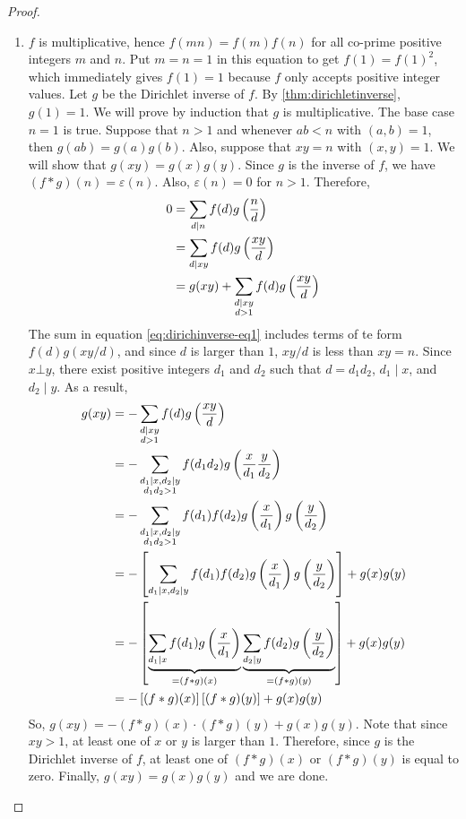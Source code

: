 \begin{proof}
\begin{enumerate}
			\item $f$ is multiplicative, hence $f(mn)=f(m)f(n)$ for all co-prime positive integers $m$ and $n$. Put $m=n=1$ in this equation to get $f(1)=f(1)^2$, which immediately gives $f(1)=1$ because $f$ only accepts positive integer values. Let $g$ be the Dirichlet inverse of $f$. By \autoref{thm:dirichletinverse}, $g(1)=1$. We will prove by induction that $g$ is multiplicative. The base case $n=1$ is true. Suppose that $n>1$ and whenever $ab<n$ with $(a,b)=1$, then $g(ab)=g(a)g(b)$. Also, suppose that $xy=n$ with $(x,y)=1$. We will show that $g(xy)=g(x)g(y)$. Since $g$ is the inverse of $f$, we have $(f \ast g)(n) = \varepsilon(n)$. Also, $\varepsilon(n)=0$ for $n>1$. Therefore,
				\begin{align}
					0 & = \sum_{d\mid n} f(d)g\left(\frac{n}{d}\right)\nonumber\\
			  & = \sum_{d\mid xy} f(d)g\left(\frac{xy}{d}\right) \nonumber\\
			  & = g(xy) + \sum\limits_{\substack{d\mid xy \\ d>1}} f(d)g\left(\frac{xy}{d}\right)\label{eq:dirichinverse-eq1}
				\end{align}
			The sum in equation \ref{eq:dirichinverse-eq1} includes terms of te form $f(d)g(xy/d)$, and since $d$ is larger than $1$, $xy/d$ is less than $xy=n$. Since $x \bot y$, there exist positive integers $d_1$ and $d_2$ such that $d=d_1d_2$, $d_1\mid x$, and $d_2\mid y$. As a result,
				\begin{align*}
					g(xy) &= - \sum\limits_{\substack{d\mid xy \\ d>1}} f(d)g\left(\frac{xy}{d}\right)\\
				  &= - \sum\limits_{\substack{d_1\mid x, d_2\mid y \\ d_1d_2>1}} f(d_1d_2)g\left(\frac{x}{d_1} \frac{y}{d_2}\right)\\
				  &= - \sum\limits_{\substack{d_1\mid x, d_2\mid y \\ d_1d_2>1}} f(d_1)f(d_2)g\left(\frac{x}{d_1}\right)g\left(\frac{y}{d_2}\right)\\
				  &= - \left[\sum\limits_{d_1\mid x, d_2\mid y} f(d_1)f(d_2)g\left(\frac{x}{d_1}\right)g\left(\frac{y}{d_2}\right)\right]+ g(x)g(y)\\
				  & = - \left[\underbrace{\sum\limits_{d_1\mid x} f(d_1)g\left(\frac{x}{d_1}\right)}_{=(f \ast g)(x)} \underbrace{\sum\limits_{d_2\mid y} f(d_2) g\left(\frac{y}{d_2}\right)}_{=(f \ast g)(y)}\right]+ g(x)g(y)\\
				  & = -\left[(f \ast g)(x)\right]\left[(f\ast g)(y)\right]+ g(x)g(y)
				\end{align*}
			So, $g(xy)= -(f \ast g)(x) \cdot (f\ast g)(y) + g(x)g(y)$. Note that since $xy>1$, at least one of $x$ or $y$ is larger than $1$. Therefore, since $g$ is the Dirichlet inverse of $f$, at least one of $(f \ast g)(x)$ or $(f \ast g)(y)$ is equal to zero. Finally, $g(xy)=g(x)g(y)$ and we are done.


\end{enumerate}
\end{proof}
